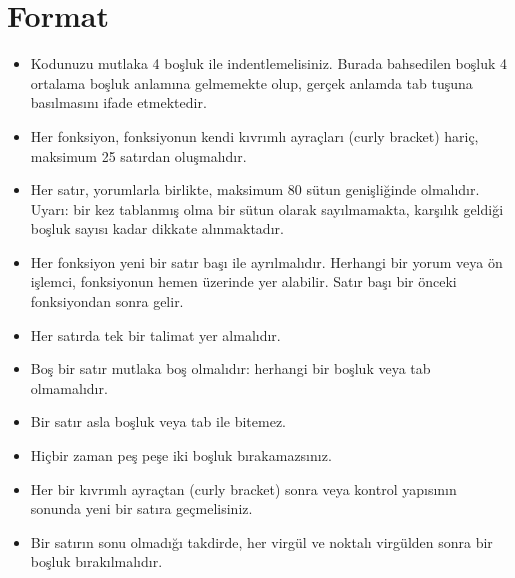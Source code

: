 \documentclass{42-en}
\begin{document}
    \section{Format}

            \begin{itemize}

                \item Kodunuzu mutlaka 4 boşluk ile indentlemelisiniz. Burada bahsedilen boşluk 4 ortalama boşluk anlamına
gelmemekte olup, gerçek anlamda tab tuşuna basılmasını ifade etmektedir.

                \item Her fonksiyon, fonksiyonun kendi kıvrımlı ayraçları (curly bracket) hariç, maksimum 25 satırdan oluşmalıdır.

                \item Her satır, yorumlarla birlikte, maksimum 80 sütun genişliğinde olmalıdır. Uyarı: bir kez tablanmış olma bir
sütun olarak sayılmamakta, karşılık geldiği boşluk sayısı kadar dikkate alınmaktadır.

                \item Her fonksiyon yeni bir satır başı ile ayrılmalıdır. Herhangi bir yorum veya ön işlemci, fonksiyonun hemen
üzerinde yer alabilir. Satır başı bir önceki fonksiyondan sonra gelir.

                \item Her satırda tek bir talimat yer almalıdır.

                \item Boş bir satır mutlaka boş olmalıdır: herhangi bir boşluk veya tab olmamalıdır.

                \item Bir satır asla boşluk veya tab ile bitemez.

                \item Hiçbir zaman peş peşe iki boşluk bırakamazsınız.

                \item Her bir kıvrımlı ayraçtan (curly bracket) sonra veya kontrol yapısının sonunda yeni bir satıra geçmelisiniz.

                \item Bir satırın sonu olmadığı takdirde, her virgül ve noktalı virgülden sonra bir boşluk bırakılmalıdır.


\end{itemize}
\end{document}
